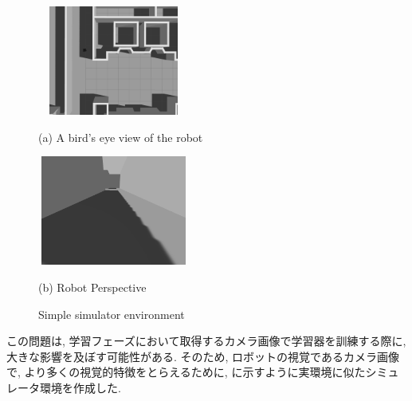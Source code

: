 \begin{itemize}
   \begin{figure}[h]
    \centering
    \begin{minipage}[b]{67mm}
      \centering
      \includegraphics[width=50mm, height=36mm]{images/sim_up.png}
      \caption*{(a) A bird's eye view of the robot}
    \end{minipage} 
    \begin{minipage}[b]{67mm}
      \centering
      \includegraphics[width=50mm, height=36mm]{images/sim_robot.png}
      \caption*{(b) Robot Perspective}
    \end{minipage}
    \caption{Simple simulator environment}
    \label{Fig:sim_shadow}
  \end{figure}

\end{itemize}

この問題は, 学習フェーズにおいて取得するカメラ画像で学習器を訓練する際に, 大きな影響を及ぼす可能性がある. そのため, ロボットの視覚であるカメラ画像で, より多くの視覚的特徴をとらえるために, に示すように実環境に似たシミュレータ環境を作成した. 

